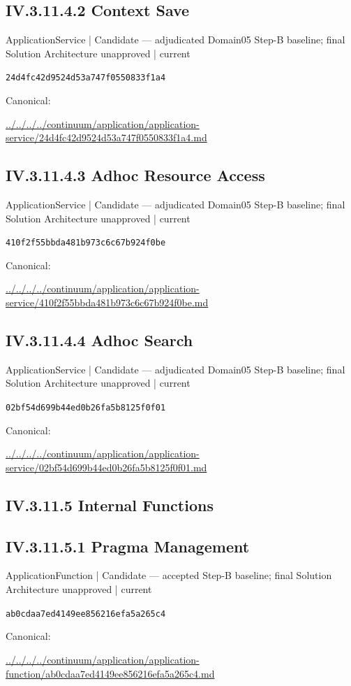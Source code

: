 \documentclass[10pt,a4paper]{article}
\begin{document}
\subsection*{IV.3.11.4.2 Context Save}
\label{element-24d4fc42d9524d53a747f0550833f1a4}
{\small ApplicationService | Candidate — adjudicated Domain05 Step-B baseline; final Solution Architecture unapproved | current}\par
\texttt{24d4fc42d9524d53a747f0550833f1a4}\par
Canonical: \par
{\footnotesize\url{../../../../continuum/application/application-service/24d4fc42d9524d53a747f0550833f1a4.md}}\par
\subsection*{IV.3.11.4.3 Adhoc Resource Access}
\label{element-410f2f55bbda481b973c6c67b924f0be}
{\small ApplicationService | Candidate — adjudicated Domain05 Step-B baseline; final Solution Architecture unapproved | current}\par
\texttt{410f2f55bbda481b973c6c67b924f0be}\par
Canonical: \par
{\footnotesize\url{../../../../continuum/application/application-service/410f2f55bbda481b973c6c67b924f0be.md}}\par
\subsection*{IV.3.11.4.4 Adhoc Search}
\label{element-02bf54d699b44ed0b26fa5b8125f0f01}
{\small ApplicationService | Candidate — adjudicated Domain05 Step-B baseline; final Solution Architecture unapproved | current}\par
\texttt{02bf54d699b44ed0b26fa5b8125f0f01}\par
Canonical: \par
{\footnotesize\url{../../../../continuum/application/application-service/02bf54d699b44ed0b26fa5b8125f0f01.md}}\par
\subsection*{IV.3.11.5 Internal Functions}
\subsection*{IV.3.11.5.1 Pragma Management}
\label{element-ab0cdaa7ed4149ee856216efa5a265c4}
{\small ApplicationFunction | Candidate — accepted Step-B baseline; final Solution Architecture unapproved | current}\par
\texttt{ab0cdaa7ed4149ee856216efa5a265c4}\par
Canonical: \par
{\footnotesize\url{../../../../continuum/application/application-function/ab0cdaa7ed4149ee856216efa5a265c4.md}}\par
\end{document}
